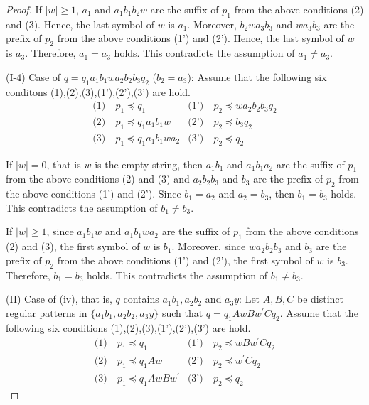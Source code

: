 \begin{proof}
If $|w| \ge 1$, $a_{1}$ and $a_{1}b_{1}b_{2}w$ are the suffix of $p_{1}$ from the above conditions (2) and (3).
Hence, the last symbol of $w$ is $a_{1}$.
Moreover, $b_{2}wa_{3}b_{3}$ and $wa_{3}b_{3}$ are the prefix of $p_{2}$ from the above conditions (1') and (2').
Hence, the last symbol of $w$ is $a_{3}$.
Therefore, $a_{1}=a_{3}$ holds.
This contradicts the assumption of $a_{1} \ne a_{3}$.
\smallskip

\noindent
(I-4) Case of $q=q_{1}a_{1}b_{1}wa_{2}b_{2}b_{3}q_{2}$ ($b_{2}=a_{3}$):
Assume that the following six conditons (1),(2),(3),(1'),(2'),(3') are hold.
\begin{align*}
\textrm{(1)}~& p_{1} \preceq q_{1} & \textrm{(1')}~& p_{2} \preceq wa_{2}b_{2}b_{3}q_{2} \\
\textrm{(2)}~& p_{1} \preceq q_{1}a_{1}b_{1}w & \textrm{(2')}~& p_{2} \preceq b_{3}q_{2} \\
\textrm{(3)}~& p_{1} \preceq q_{1}a_{1}b_{1}wa_{2} & \textrm{(3')}~& p_{2} \preceq q_{2}
\end{align*}
\noindent

If $|w|=0$, that is $w$ is the empty string, then $a_{1}b_{1}$ and $a_{1}b_{1}a_{2}$ are the suffix of $p_{1}$ from the above conditions (2) and (3)
and $a_{2}b_{2}b_{3}$ and $b_{3}$ are the prefix of $p_{2}$ from the above conditions (1') and (2').
Since $b_{1}=a_{2}$ and $a_{2}=b_{3}$, then $b_{1}=b_{3}$ holds.
This contradicts the assumption of $b_{1}\not= b_{3}$.

If $|w| \ge 1$, since $a_{1}b_{1}w$ and $a_{1}b_{1}wa_{2}$ are the suffix of $p_{1}$ from the above conditions (2) and (3), the first symbol of $w$ is $b_{1}$.
Moreover, since $wa_{2}b_{2}b_{3}$ and $b_{3}$ are the prefix of $p_{2}$ from the above conditions (1') and (2'),
the first symbol of $w$ is $b_{3}$.
Therefore, $b_{1}=b_{3}$ holds.
This contradicts the assumption of $b_{1} \ne b_{3}$.


\smallskip

\noindent
(II) Case of (iv), that is, $q$ contains $a_{1}b_{1}, a_{2}b_{2}$ and $a_{3}y$:
Let $A,B,C$ be distinct regular patterns in $\{a_{1}b_{1}, a_{2}b_{2}, a_{3}y\}$ such that $q=q_{1}AwBw^{\prime}Cq_{2}$.
Assume that the following six conditions (1),(2),(3),(1'),(2'),(3') are hold.
\begin{align*}
\textrm{(1)}~& p_{1} \preceq q_{1} & \textrm{(1')}~& p_{2} \preceq wBw^{\prime}Cq_{2} \\
\textrm{(2)}~& p_{1} \preceq q_{1}Aw & \textrm{(2')}~& p_{2} \preceq w^{\prime}Cq_{2} \\
\textrm{(3)}~& p_{1} \preceq q_{1}AwBw^{\prime} & \textrm{(3')}~& p_{2} \preceq q_{2}
\end{align*}


\end{proof}
